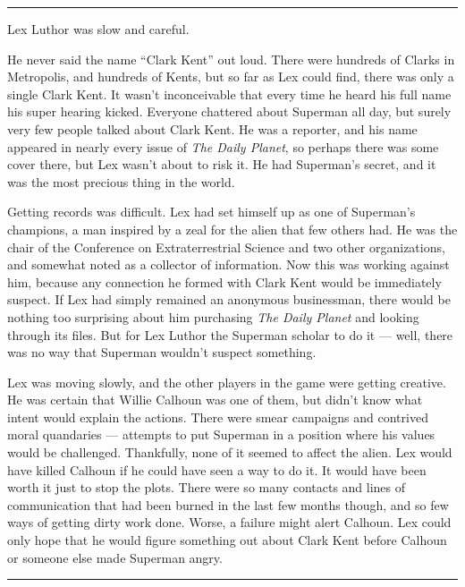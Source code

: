 \begin{center}\rule{0.5\linewidth}{0.5pt}\end{center}

Lex Luthor was slow and careful.

He never said the name ``Clark Kent'' out loud. There were hundreds of
Clarks in Metropolis, and hundreds of Kents, but so far as Lex could
find, there was only a single Clark Kent. It wasn't inconceivable that
every time he heard his full name his super hearing kicked. Everyone
chattered about Superman all day, but surely very few people talked
about Clark Kent. He was a reporter, and his name appeared in nearly
every issue of \emph{The Daily Planet}, so perhaps there was some cover
there, but Lex wasn't about to risk it. He had Superman's secret, and it
was the most precious thing in the world.

Getting records was difficult. Lex had set himself up as one of
Superman's champions, a man inspired by a zeal for the alien that few
others had. He was the chair of the Conference on Extraterrestrial
Science and two other organizations, and somewhat noted as a collector
of information. Now this was working against him, because any connection
he formed with Clark Kent would be immediately suspect. If Lex had
simply remained an anonymous businessman, there would be nothing too
surprising about him purchasing \emph{The Daily Planet} and looking
through its files. But for Lex Luthor the Superman scholar to do it ---
well, there was no way that Superman wouldn't suspect something.

Lex was moving slowly, and the other players in the game were getting
creative. He was certain that Willie Calhoun was one of them, but didn't
know what intent would explain the actions. There were smear campaigns
and contrived moral quandaries --- attempts to put Superman in a
position where his values would be challenged. Thankfully, none of it
seemed to affect the alien. Lex would have killed Calhoun if he could
have seen a way to do it. It would have been worth it just to stop the
plots. There were so many contacts and lines of communication that had
been burned in the last few months though, and so few ways of getting
dirty work done. Worse, a failure might alert Calhoun. Lex could only
hope that he would figure something out about Clark Kent before Calhoun
or someone else made Superman angry.

\begin{center}\rule{0.5\linewidth}{0.5pt}\end{center}

